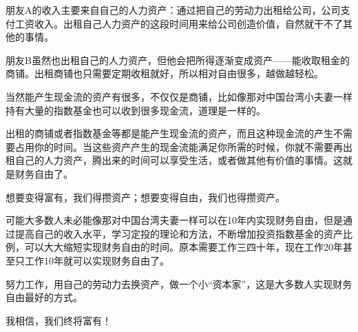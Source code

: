 朋友A的收入主要来自自己的人力资产：通过把自己的劳动力出租给公司，公司支付工资收入。出租自己人力资产的这段时间用来给公司创造价值，自然就干不了其他的事情。

朋友B虽然也出租自己的人力资产，但他会把所得逐渐变成资产——能收取租金的商铺。出租商铺也只需要定期收租就好，所以相对自由很多，越做越轻松。

当然能产生现金流的资产有很多，不仅仅是商铺，比如像那对中国台湾小夫妻一样持有大量的指数基金也可以收到很多现金流，道理是一样的。

出租的商铺或者指数基金等都是能产生现金流的资产，而且这种现金流的产生不需要占用你的时间。当这些资产产生的现金流能满足你所需的时候，你就不需要再出租自己的人力资产，腾出来的时间可以享受生活，或者做其他有价值的事情。这就是财务自由了。

想要变得富有，我们得攒资产；想要变得自由，我们也得攒资产。

可能大多数人未必能像那对中国台湾夫妻一样可以在10年内实现财务自由，但是通过提高自己的收入水平，学习定投的理论和方法，不断增加投资指数基金的资产比例，可以大大缩短实现财务自由的时间。原本需要工作三四十年，现在工作20年甚至只工作10年就可以实现财务自由了。

努力工作，用自己的劳动力去换资产，做一个小“资本家”，这是大多数人实现财务自由最好的方式。

我相信，我们终将富有！
